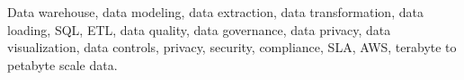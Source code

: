 \documentclass{resume} %
\begin{document}



\newcommand\myfontsize{\fontsize{0.1pt}{0.1pt}\selectfont} \myfontsize \color{white}
{Data warehouse, data modeling, data extraction, data transformation, data loading, SQL, ETL, data quality, data governance, data privacy, data visualization, data controls, privacy, security, compliance, SLA, AWS, terabyte to petabyte scale data.}
\end{document}
